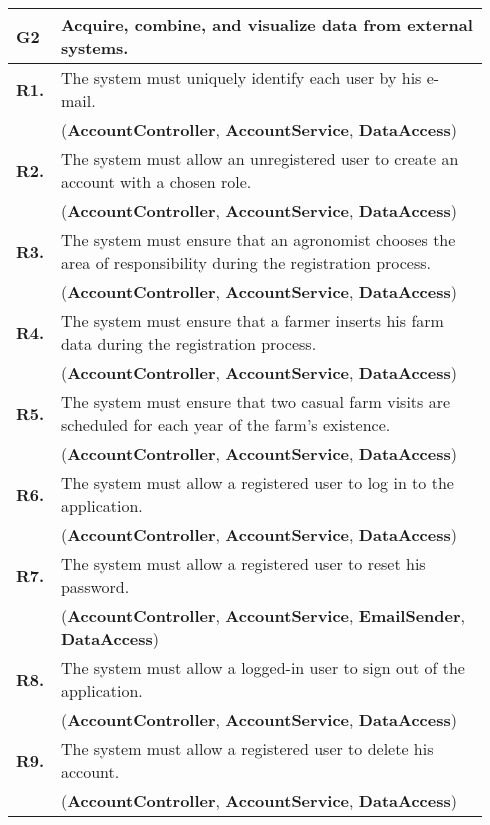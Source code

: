 \begin{longtable}{p{0.06\linewidth} p{0.88\linewidth}} 
    \toprule
    \textbf{G2} & Acquire, combine, and visualize data from external systems. \\ 
    \midrule
	\textbf{R1.} & The system must uniquely identify each user by his e-mail. \\
	& (\textbf{AccountController}, \textbf{AccountService}, \textbf{DataAccess})\\
	\textbf{R2.} & The system must allow an unregistered user to create an account with a chosen role. \\
	& (\textbf{AccountController}, \textbf{AccountService}, \textbf{DataAccess})\\
	\textbf{R3.} & The system must ensure that an agronomist chooses the area of responsibility during the registration process. \\
	& (\textbf{AccountController}, \textbf{AccountService}, \textbf{DataAccess})\\
	\textbf{R4.} & The system must ensure that a farmer inserts his farm data during the registration process.\\
	& (\textbf{AccountController}, \textbf{AccountService}, \textbf{DataAccess})\\
	\textbf{R5.} & The system must ensure that two casual farm visits are scheduled for each year of the farm's existence.\\
	& (\textbf{AccountController}, \textbf{AccountService}, \textbf{DataAccess})\\
	\textbf{R6.} & The system must allow a registered user to log in to the application. \\
	& (\textbf{AccountController}, \textbf{AccountService}, \textbf{DataAccess})\\
	\textbf{R7.} & The system must allow a registered user to reset his password. \\
	& (\textbf{AccountController}, \textbf{AccountService}, \textbf{EmailSender}, \textbf{DataAccess})\\
	\textbf{R8.} & The system must allow a logged-in user to sign out of the application. \\
	& (\textbf{AccountController}, \textbf{AccountService}, \textbf{DataAccess})\\
	\textbf{R9.} & The system must allow a registered user to delete his account. \\
	& (\textbf{AccountController}, \textbf{AccountService}, \textbf{DataAccess})\\
	

\end{longtable}
